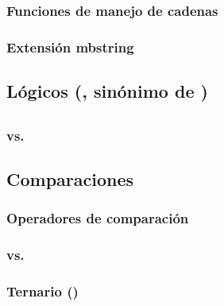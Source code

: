 \documentclass[a4paper,11pt,spanish]{sphinxmanual}
\begin{document}
\subsubsection{Funciones de manejo de cadenas}
\label{\detokenize{contenidos:id73}}

\subsubsection{Extensión mbstring}
\label{\detokenize{contenidos:id74}}

\subsection{Lógicos (, sinónimo de )}
\label{\detokenize{contenidos:id75}}

\subsection{}
\label{\detokenize{contenidos:id76}}

\subsubsection{ vs. }
\label{\detokenize{contenidos:id77}}

\subsection{Comparaciones}
\label{\detokenize{contenidos:id78}}

\subsubsection{Operadores de comparación}
\label{\detokenize{contenidos:id79}}

\subsubsection{\sphinxstyleliteralintitle{==} vs. \sphinxstyleliteralintitle{===}}
\label{\detokenize{contenidos:id80}}

\subsubsection{Ternario ()}
\label{\detokenize{contenidos:id81}}
\end{document}
